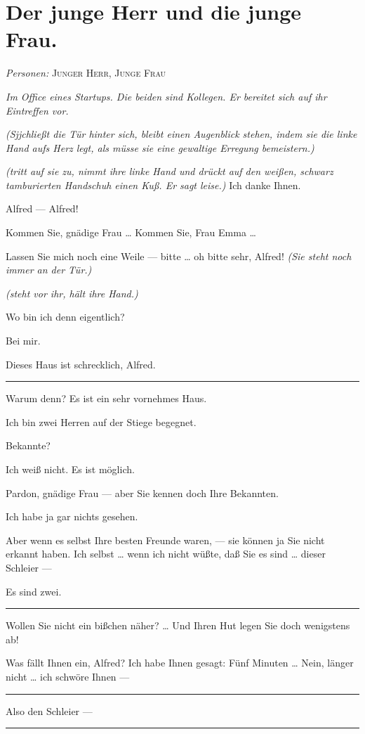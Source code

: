 \documentclass[
	final,
	a4paper,
	ngerman,
	mpinclude = true, %
	twoside = true,
	open = right,
	cleardoublepage = plain,
	DIV = 13,
	BCOR = 1cm,
	titlepage = firstiscover,
	]{scrbook}
\newcommand{\scene}{\section}
\newcommand{\direction}[1]{\textit{(#1)}}
\newcommand{\setting}[1]{\vspace{-0.5\baselineskip}\centering\textit{#1}}
\newenvironment{deletion}{%
		\vspace{0.25\baselineskip}
		\hrule
		\vspace{0.25\baselineskip}
		\color{darkgray}
	}{
		\color{black}
		\vspace{0.25\baselineskip}
		\hrule 
		\vspace{0.25\baselineskip}
	}
\newcommand{\characterlist}[1]{{\begin{center}\textit{Personen:} #1\end{center}}}
\newcommand{\thecharacter}[1]{\textup{\textsc{#1}}\xspace}
\newcommand{\theherr}{\thecharacter{Junger Herr}}
\newcommand{\thefrau}{\thecharacter{Junge Frau}}
\newcommand{\character}[1]{\item[#1:]}
\newcommand{\herr}{\character{\theherr}}
\newcommand{\frau}{\character{\thefrau}}
\begin{document}
\scene{Der junge Herr und die junge Frau.}
\characterlist{\theherr, \thefrau}
\setting{Im Office eines Startups. Die beiden sind Kollegen. Er bereitet sich auf ihr Eintreffen vor.}
\begin{play}

	\frau
	\direction{Sjjchließt die Tür hinter sich, bleibt einen Augenblick stehen, indem sie die linke Hand aufs Herz legt, als müsse sie eine gewaltige Erregung bemeistern.}

	\herr
	\direction{tritt auf sie zu, nimmt ihre linke Hand und drückt auf den weißen, schwarz tamburierten Handschuh einen Kuß. Er sagt leise.} Ich danke Ihnen.

	\frau
	Alfred --- Alfred!

	\herr
	Kommen Sie, gnädige Frau \ldots{} Kommen Sie, Frau Emma \ldots{}

	\frau
	Lassen Sie mich noch eine Weile --- bitte \ldots{} oh bitte sehr, Alfred! \direction{Sie steht noch immer an der Tür.}

	\herr
	\direction{steht vor ihr, hält ihre Hand.}

	\frau
	Wo bin ich denn eigentlich?

	\herr
	Bei mir.

	\frau
	Dieses Haus ist schrecklich, Alfred.

	\begin{deletion}
	\herr
	Warum denn? Es ist ein sehr vornehmes Haus.

	\frau
	Ich bin zwei Herren auf der Stiege begegnet.

	\herr
	Bekannte?

	\frau
	Ich weiß nicht. Es ist möglich.

	\herr
	Pardon, gnädige Frau --- aber Sie kennen doch Ihre Bekannten.

	\frau
	Ich habe ja gar nichts gesehen.

	\herr
	Aber wenn es selbst Ihre besten Freunde waren, --- sie können ja Sie nicht erkannt haben. Ich selbst \ldots{} wenn ich nicht wüßte, daß Sie es sind \ldots{} dieser Schleier ---

	\frau
	Es sind zwei.
	\end{deletion}

	\herr
	Wollen Sie nicht ein bißchen näher? \ldots{} Und Ihren Hut legen Sie doch wenigstens ab!

	\frau
	Was fällt Ihnen ein, Alfred? Ich habe Ihnen gesagt: Fünf Minuten \ldots{} Nein, länger nicht \ldots{} ich schwöre Ihnen ---

	\begin{deletion}
	\herr
	Also den Schleier ---


\end{deletion}
\end{play}
\end{document}
